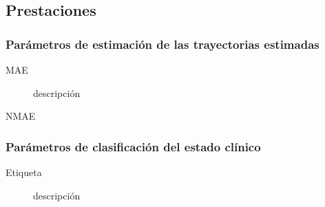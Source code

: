 \documentclass[12pt]{article}
\begin{document}
\subsection{Prestaciones}
\subsubsection{Parámetros de estimación de las trayectorias estimadas}
\begin{description}
	\item[MAE] descripción
	\item [NMAE]
\end{description}
\subsubsection{Parámetros de clasificación del estado clínico}



\begin{description}
	\item[Etiqueta] descripción
\end{description}
\end{document}
